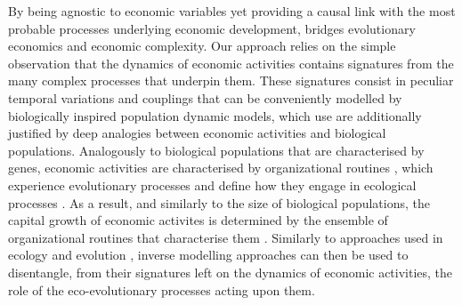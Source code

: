 By being agnostic to economic variables yet providing a causal link with the most probable processes underlying economic development, \chapiii bridges evolutionary economics and economic complexity.
% 
Our approach relies on the simple observation that the dynamics of economic activities contains signatures from the many complex processes that underpin them.
% 
These signatures consist in peculiar temporal variations and couplings that can be conveniently modelled by biologically inspired population dynamic models, which use are additionally justified by deep analogies between economic activities and biological populations. 
% 
Analogously to biological populations that are characterised by genes, economic activities are characterised by organizational routines \citep{NelsonWinter}, which experience evolutionary processes and define how they engage in ecological processes \citep{NelsonWinter}.
% 
% 
As a result, and similarly to the size of biological populations, the capital growth of economic activites is determined by the ensemble of organizational routines that characterise them \citep{Boschma2005a}.
% 
Similarly to approaches used in ecology and evolution \citep{Skeels}, inverse modelling approaches can then be used to disentangle, from their signatures \citep{Skeels} left on the dynamics of economic activities, the role of the eco-evolutionary processes acting upon them.


